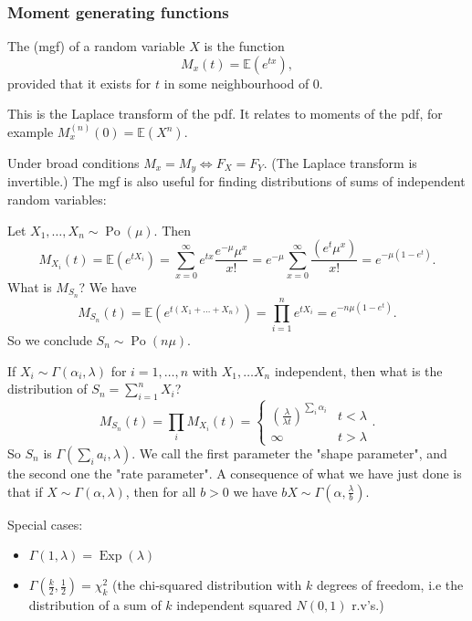 \documentclass[egregdoesnotlikesansseriftitles,a4paper]{scrartcl}
\begin{document}
\subsubsection*{Moment generating functions}
\begin{definition*}
     The  (mgf) of a random variable $X$ is the function \[
          M_{x}(t)=\mathbb{E}(e^{tx})
     ,\] 
     provided that it exists for $t$ in some neighbourhood of 0.
\end{definition*} This is the Laplace transform of the pdf. It relates to moments of the pdf, for example $M_{x}^{(n)}(0)=\mathbb{E} (X^{n})$. 

Under broad conditions $M_{x}=M_{y} \iff F_{X}=F_{Y}$. (The Laplace transform is invertible.) The mgf is also useful for finding distributions of sums of independent random variables: 
\begin{example*}
     Let $X_1 , \ldots ,X_n \sim \operatorname{Po}(\mu)$. Then \[
     M_{X_{i}}(t)=\mathbb{E}(e^{tX_{i}})=\sum_{x=0}^{ \infty}e^{tx} \frac{e^{-\mu}\mu^{x}}{x!}=e^{-\mu}\sum_{x=0}^{ \infty}\frac{(e^{t}\mu^{x})}{x!}=e^{-\mu (1-e^{t})}
     .\] 
     What is $M_{S_{n}}$? We have \[
     M_{S_{n}}(t)=\mathbb{E}(e^{t (X_1 +\ldots +X_n)})=\prod_{i=1}^n e^{tX_{i}}=e^{-n \mu (1-e^{t})}
     .\] So we conclude $S_{n} \sim \operatorname{Po}(n \mu)$.
\end{example*}
\begin{example*}
     If $X_{i} \sim \Gamma (\alpha_{i}, \lambda)$ for $i=1,\ldots ,n$ with $X_1 , \ldots X_n$ independent, then what is the distribution of $S_{n}=\sum_{i=1}^{n}X_{i}$? \[
          M_{S_{n}}(t)=\prod_{i}M_{X_{i}}(t)=
          \begin{cases}
              \left(\frac{\lambda}{\lambda t}\right)^{\sum_{i}^{}\alpha_{i}} & t<\lambda\\
              \infty & t>\lambda
          \end{cases}
          .\]  
          So $S_{n}$ is $\Gamma (\sum_{i}^{}a_{i}, \lambda)$. We call the first parameter the "shape parameter", and the second one the "rate parameter". A consequence of what we have just done is that if $X \sim \Gamma (\alpha, \lambda)$, then for all $b>0$ we have $bX \sim \Gamma (\alpha, \frac{\lambda}{b})$. 
          
          Special cases: 
          \begin{itemize}
              \item $\Gamma (1, \lambda)=\operatorname{Exp}(\lambda)$ 
              \item $\Gamma \left(\frac{k}{2},\frac{1}{2}\right)=\chi_k^2$ (the chi-squared distribution with $k$ degrees of freedom, i.e the distribution of a sum of $k$ independent squared $N (0,1)$ r.v's.)
          \end{itemize}
\end{example*}
\end{document}
